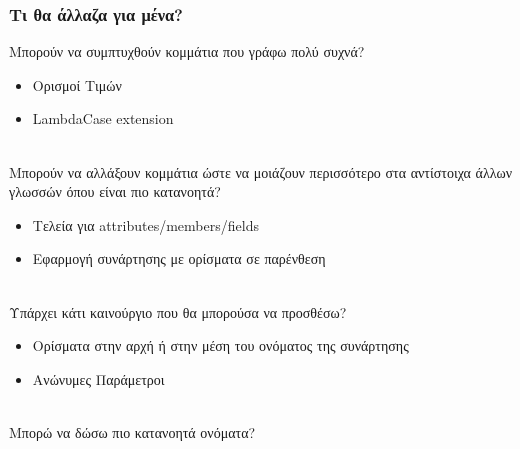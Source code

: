 \documentclass{beamer}
\def\e{\foreignlanguage{english}}
\begin{document}
\begin{frame}

\frametitle{Τι θα άλλαζα για μένα?}

Μπορούν να συμπτυχθούν κομμάτια που γράφω πολύ συχνά?
\begin{itemize}

\item Ορισμοί Τιμών

\item \e{LambdaCase extension}
\\~\

\end{itemize}

Μπορούν να αλλάξουν κομμάτια ώστε να μοιάζουν περισσότερο στα αντίστοιχα άλλων
γλωσσών όπου είναι πιο κατανοητά?
\begin{itemize}

\item Τελεία για \e{attributes/members/fields}

\item Εφαρμογή συνάρτησης με ορίσματα σε παρένθεση
\\~\

\end{itemize}

Υπάρχει κάτι καινούργιο που θα μπορούσα να προσθέσω?
\begin{itemize}

\item Ορίσματα στην αρχή ή στην μέση του ονόματος της συνάρτησης

\item Ανώνυμες Παράμετροι
\\~\

\end{itemize}
Μπορώ να δώσω πιο κατανοητά ονόματα?

\end{frame}
\end{document}
